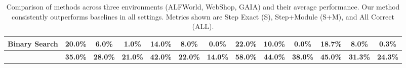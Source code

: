 \begin{table}[hbtp]
{\begin{tabular}{l ccc ccc ccc ccc}
Binary Search
& \cellcolor{GreenLight}20.0\% & \cellcolor{GreenLight}6.0\% & \cellcolor{GreenLight}1.0\%
& \cellcolor{OrangeLight}14.0\% & \cellcolor{OrangeLight}8.0\% & \cellcolor{OrangeLight}0.0\%
& \cellcolor{PurpleLight}22.0\% & \cellcolor{PurpleLight}10.0\% & \cellcolor{PurpleLight}0.0\%
& \cellcolor{PinkLight}18.7\% & \cellcolor{PinkLight}8.0\% & \cellcolor{PinkLight}0.3\% \\
\midrule

\textbf{\ModelName{}}
& \cellcolor{GreenLight}\textbf{35.0\%} & \cellcolor{GreenLight}\textbf{28.0\%} & \cellcolor{GreenLight}\textbf{21.0\%}
& \cellcolor{OrangeLight}\textbf{42.0\%} & \cellcolor{OrangeLight}\textbf{22.0\%} & \cellcolor{OrangeLight}\textbf{14.0\%}
& \cellcolor{PurpleLight}\textbf{58.0\%} & \cellcolor{PurpleLight}\textbf{44.0\%} & \cellcolor{PurpleLight}\textbf{38.0\%}
& \cellcolor{PinkLight}\textbf{45.0\%} & \cellcolor{PinkLight}\textbf{31.3\%} & \cellcolor{PinkLight}\textbf{24.3\%} \\

\bottomrule
\end{tabular}}
\caption{Comparison of methods across three environments (ALFWorld, WebShop, GAIA) and their average performance. Our method consistently outperforms baselines in all settings. Metrics shown are Step Exact (S), Step+Module (S+M), and All Correct (ALL).}
\label{tab:exp1}
\end{table}









